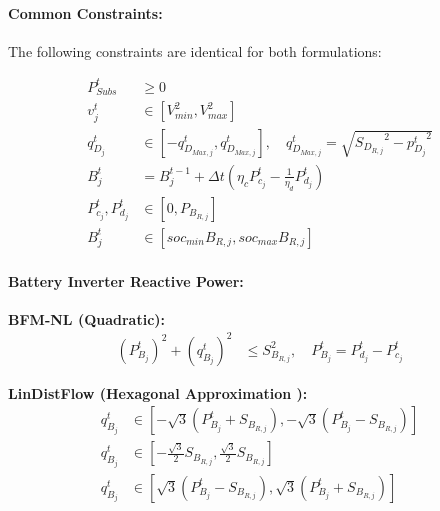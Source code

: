 \paragraph{Common Constraints:}

The following constraints are identical for both formulations:

\begin{align}
    {P^t_{Subs}} &\geq {0} \label{eq:mpopf-tradeoffs-subs-power} \\
    { v^{t}_{j} } &\in { [V^{2}_{min}, V^{2}_{max}] } \label{eq:mpopf-tradeoffs-voltage-limits} \\
    { q^{t}_{D_{j}} } &\in { [-q_{D_{Max, j}}^{t}, q_{D_{Max, j}}^{t}] }, \quad q_{D_{Max, j}}^{t} = \sqrt{ {S_{D_{R, j}}}^2 - {p^{t}_{D_{j}}}^2} \label{eq:mpopf-tradeoffs-pv-reactive} \\
    {B_{j}^{t}} &= {B_{j}^{t-1} + \Delta t ( \eta_c P_{c_j}^t - \frac{1}{\eta_d} P_{d_j}^t )  } \label{eq:mpopf-tradeoffs-soc-trajectory} \\
    { P^{t}_{c_{j}}, P^{t}_{d_{j}} } &\in { [0, P_{B_{R, j}} ]} \label{eq:mpopf-tradeoffs-battery-power-limits} \\
    { B^{t}_{j} } &\in { [soc_{min}B_{R, j}, soc_{max}B_{R, j}] } \label{eq:mpopf-tradeoffs-soc-limits}
\end{align}

\paragraph{Battery Inverter Reactive Power:}

\textbf{BFM-NL (Quadratic):}
\begin{align}
    {(P_{B_j}^t)^2 + (q_{B_j}^t)^2} &\leq {S_{B_{R, j}}^2}, \quad P_{B_j}^t = P_{d_j}^t - P_{c_j}^t
    \label{eq:mpopf-tradeoffs-battery-reactive-nl}
\end{align}

\textbf{LinDistFlow (Hexagonal Approximation \cite{Ahmadi2014Oct}):}
\begin{subequations}
    \label{eq:mpopf-tradeoffs-battery-reactive-l}
    \begin{align}
        q_{B_j}^t &\in [-\sqrt{3} (P_{B_j}^t + S_{B_{R, j}}), -\sqrt{3} (P_{B_j}^t - S_{B_{R, j}})]  \\
        q_{B_j}^t &\in [-\frac{\sqrt{3}}{2} S_{B_{R, j}}, \frac{\sqrt{3}}{2} S_{B_{R, j}}] \\
        q_{B_j}^t &\in [\sqrt{3} (P_{B_j}^t - S_{B_{R, j}}), \sqrt{3} (P_{B_j}^t + S_{B_{R, j}})] 
    \end{align}
\end{subequations}

